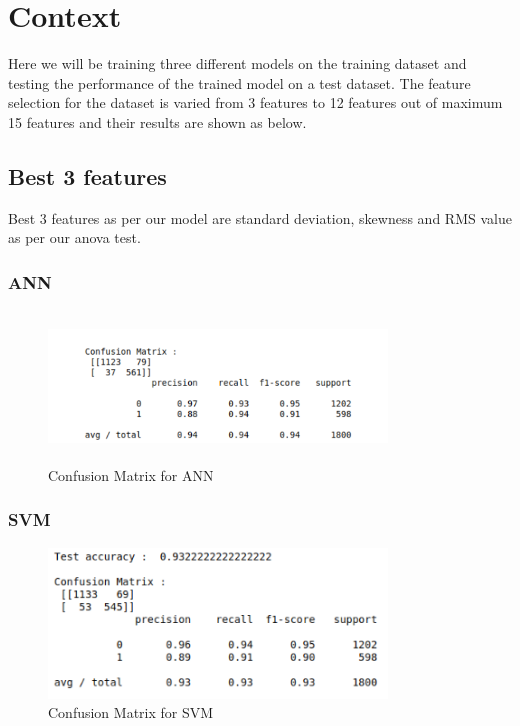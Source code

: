 
\section{Context}
Here we will be training three different models on the training dataset and testing the performance of the trained model on a test dataset. The feature selection for the dataset is varied from 3 features to 12 features out of maximum 15 features and their results are shown as below.

\subsection{Best 3 features}
Best 3 features as per our model are standard deviation, skewness and RMS value as per our anova test.

\subsubsection{ANN}

\begin{figure}[H]
  \includegraphics[height = 4cm,width= 9cm]{images/3_feat_ANN}
   \caption{Confusion Matrix for ANN}
\end{figure}

\subsubsection{SVM}

\begin{figure}[H]
  \includegraphics[height = 4cm,width= 9cm]{images/3_feat_SWM}
  \caption{Confusion Matrix for SVM}  
  \end{figure}

